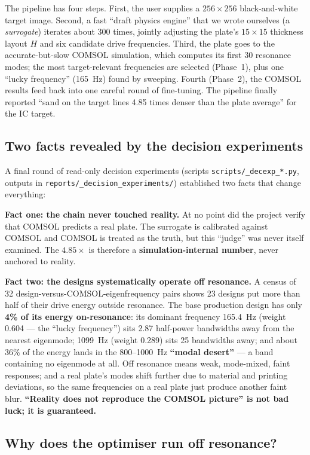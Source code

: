 \documentclass[11pt,a4paper]{article}
\newcommand{\code}[1]{\texttt{#1}}
\begin{document}
The pipeline has four steps. First, the user supplies a $256\times 256$ black-and-white target image. Second, a fast ``draft physics engine'' that we wrote ourselves (a \emph{surrogate}) iterates about 300 times, jointly adjusting the plate's $15\times 15$ thickness layout $H$ and six candidate drive frequencies. Third, the plate goes to the accurate-but-slow COMSOL simulation, which computes its first 30 resonance modes; the most target-relevant frequencies are selected (Phase~1), plus one ``lucky frequency'' (165~Hz) found by sweeping. Fourth (Phase~2), the COMSOL results feed back into one careful round of fine-tuning. The pipeline finally reported ``sand on the target lines 4.85 times denser than the plate average'' for the IC target.

\subsection{Two facts revealed by the decision experiments}

A final round of read-only decision experiments (scripts \code{scripts/\_decexp\_*.py}, outputs in \code{reports/\_decision\_experiments/}) established two facts that change everything:

\textbf{Fact one: the chain never touched reality.} At no point did the project verify that COMSOL predicts a real plate. The surrogate is calibrated against COMSOL and COMSOL is treated as the truth, but this ``judge'' was never itself examined. The $4.85\times$ is therefore a \textbf{simulation-internal number}, never anchored to reality.

\textbf{Fact two: the designs systematically operate off resonance.} A census of 32 design-versus-COMSOL-eigenfrequency pairs shows 23 designs put more than half of their drive energy outside resonance. The base production design has only \textbf{4\% of its energy on-resonance}: its dominant frequency 165.4~Hz (weight 0.604 --- the ``lucky frequency'') sits 2.87 half-power bandwidths away from the nearest eigenmode; 1099~Hz (weight 0.289) sits 25 bandwidths away; and about 36\% of the energy lands in the 800--1000~Hz \textbf{``modal desert''} --- a band containing no eigenmode at all. Off resonance means weak, mode-mixed, faint responses; and a real plate's modes shift further due to material and printing deviations, so the same frequencies on a real plate just produce another faint blur. \textbf{``Reality does not reproduce the COMSOL picture'' is not bad luck; it is guaranteed.}

\subsection{Why does the optimiser run off resonance?}
\end{document}

